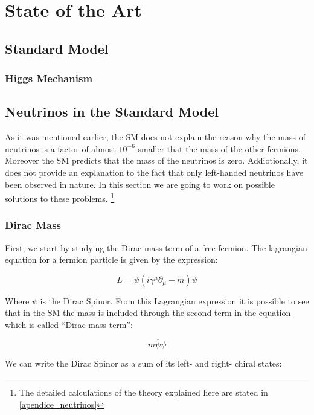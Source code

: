 \chapter{State of the Art} 

\section{Standard Model}

\subsection{Higgs Mechanism}

\section{Neutrinos in the Standard Model}

As it was mentioned earlier, the SM does not explain the reason why the mass of neutrinos is a factor of almost $10^{-6}$ smaller that the mass of the other fermions. Moreover the SM predicts that
the mass of the neutrinos is zero. Addiotionally, it does not provide an explanation to the fact that only left-handed neutrinos have been observed in nature. 
In this section we are going to work on possible solutions to these problems. \footnote{The detailed calculations of the theory explained here are stated in \ref{apendice_neutrinos}}

\subsection{Dirac Mass}

First, we start by studying the Dirac mass term of a free fermion. The lagrangian equation for a fermion particle is given by the expression:

\begin{equation}
 L = \overline{\psi} \left( i \gamma ^\mu \partial_{\mu} - m \right) \psi
\end{equation}

Where $\psi$ is the Dirac Spinor. From this Lagrangian expression it is possible to see that in the SM the mass is included through the second term in the equation which is called ``Dirac mass term'':

\begin{equation}
 m \overline{\psi} \psi
\end{equation}

We can write the Dirac Spinor as a sum of its left- and right- chiral states:

